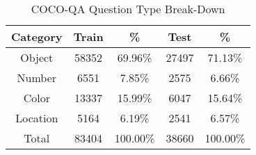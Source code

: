 \documentclass{article}
\renewcommand{\#}[1]{\textbf{#1}}
\begin{document}
 

\begin{table}
\label{tab:dataset_stats}
\caption{
COCO-QA Question Type Break-Down}
\vskip 0.15in
\begin{center}
\begin{small}
\begin{sc}
\begin{tabular}{c c c c c}
\hline
\abovespace\belowspace
Category & Train & \%       & Test  & \%       \\
\hline
\abovespace
Object   & 58352 & 69.96\%  & 27497 & 71.13\%  \\
Number   & 6551  & 7.85\%   & 2575  & 6.66\%   \\
Color    & 13337 & 15.99\%  & 6047  & 15.64\%  \\
\belowspace
Location & 5164  & 6.19\%   & 2541  & 6.57\%   \\
\hline
\belowspace
\abovespace
Total    & 83404 & 100.00\% & 38660 & 100.00\% \\
\hline
\end{tabular}
\end{sc}
\end{small}
\end{center}
\end{table}
\end{document}
